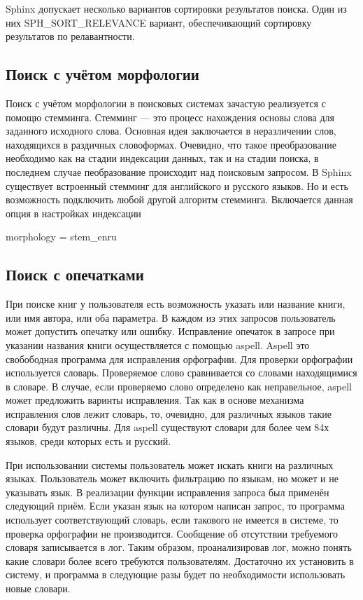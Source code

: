 Sphinx допускает несколько вариантов сортировки результатов поиска.
Один из них SPH\_SORT\_RELEVANCE вариант, обеспечивающий сортировку результатов по релавантности.

\subsection{Поиск с учётом морфологии}

Поиск с учётом морфологии в поисковых системах зачастую реализуется с помощю стемминга. Стемминг --- это процесс нахождения основы слова для заданного исходного слова.
Основная идея заключается в неразличении слов, находящихся в раздичных словоформах.
Очевидно, что такое преобразование необходимо как на стадии индексации данных, так и на стадии поиска, в последнем случае пеобразование происходит над поисковым запросом.
В Sphinx существует встроенный стемминг для английского и русского языков.
Но и есть возможность подключить любой другой алгоритм стемминга.
Включается данная опция в настройках индексации 

morphology = stem\_enru

\subsection{Поиск с опечатками}

При поиске книг у пользователя есть возможность указать или название книги, или имя автора, или оба параметра. В каждом из этих запросов пользователь может допустить опечатку или ошибку.
Исправление опечаток в запросе при указании названия книги осуществляется с помощью aspell. 
Aspell это свобободная программа для исправления орфографии.
Для проверки орфографии используется словарь. 
Проверяемое слово сравнивается со словами находящимися в словаре.
В случае, если проверяемо слово определено как неправельное, aspell может предложить варинты исправления. Так как в основе механизма исправления слов лежит словарь, то, очевидно, для различных языков такие словари будут различны. Для aspell существуют словари для более чем 84х языков,
среди которых есть и русский.

При использовании системы пользователь может искать книги на различных языках. Пользователь может включить фильтрацию по языкам, но может и не указывать язык.
В реализации функции исправления запроса был применён следующий приём.
Если указан язык на котором написан запрос, то программа использует соответствующий словарь, если такового не имеется в системе, то проверка орфографии не производится. Сообщение об отсутствии требуемого словаря записывается в лог.
Таким образом, проанализировав лог, можно понять какие словари более всего требуются пользователям. Достаточно их установить в систему, и программа в следующие разы будет по необходимости использовать новые словари.


